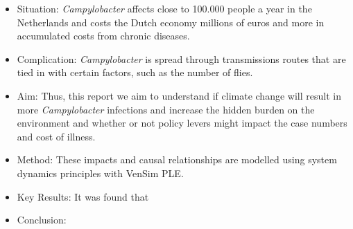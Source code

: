 \begin{itemize}
    \item Situation: \textit{Campylobacter} affects close to 100.000 people a year in the Netherlands and costs the Dutch economy millions of euros and more in accumulated costs from chronic diseases. 
    
    \item Complication: \textit{Campylobacter} is spread through transmissions routes that are tied in with certain factors, such as the number of flies. 
    
    \item Aim: Thus, this report we aim to understand if climate change will result in more \textit{Campylobacter} infections and increase the hidden burden on the environment and whether or not policy levers might impact the case numbers and cost of illness. 
    \item Method: These impacts and causal relationships are modelled using system dynamics principles with VenSim PLE. 
    
    \item Key Results: It was found that 
    
    \item Conclusion: 
\end{itemize}